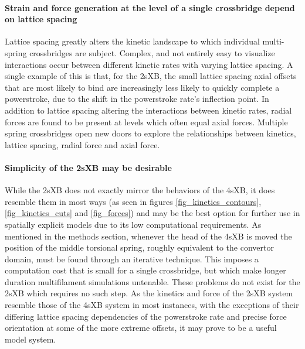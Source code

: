 \documentclass[]{article}
\begin{document}
\paragraph{Strain and force generation at the level of a single crossbridge depend on lattice spacing} %
Lattice spacing greatly alters the kinetic landscape to which individual multi-spring crossbridges are subject.
Complex, and not entirely easy to visualize interactions occur between different kinetic rates with varying lattice spacing. 
A single example of this is that, for the 2sXB, the small lattice spacing axial offsets that are most likely to bind are increasingly less likely to quickly complete a powerstroke, due to the shift in the powerstroke rate's inflection point.
In addition to lattice spacing altering the interactions between kinetic rates, radial forces are found to be present at levels which often equal axial forces. 
Multiple spring crossbridges open new doors to explore the relationships between kinetics, lattice spacing, radial force and axial force.


\paragraph{Simplicity of the 2sXB may be desirable} %
While the 2sXB does not exactly mirror the behaviors of the 4sXB, it does resemble them in most ways (as seen in figures \ref{fig_kinetics_contours}, \ref{fig_kinetics_cuts} and \ref{fig_forces}) and may be the best option for further use in spatially explicit models due to its low computational requirements.
As mentioned in the methods section, whenever the head of the 4sXB is moved the position of the middle torsional spring, roughly equivalent to the convertor domain, must be found through an iterative technique. 
This imposes a computation cost that is small for a single crossbridge, but which make longer duration multifilament simulations untenable. 
These problems do not exist for the 2sXB which requires no such step.
As the kinetics and force of the 2sXB system resemble those of the 4sXB system in most instances, with the exceptions of their differing lattice spacing dependencies of the powerstroke rate and precise force orientation at some of the more extreme offsets, it may prove to be a useful model system.
\end{document}
